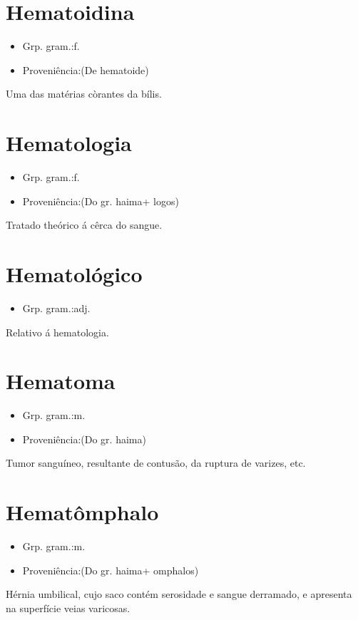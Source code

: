 \documentclass{article}
\begin{document}
\section{Hematoidina}
\begin{itemize}
\item {Grp. gram.:f.}
\end{itemize}
\begin{itemize}
\item {Proveniência:(De \textunderscore hematoide\textunderscore )}
\end{itemize}
Uma das matérias còrantes da bílis.
\section{Hematologia}
\begin{itemize}
\item {Grp. gram.:f.}
\end{itemize}
\begin{itemize}
\item {Proveniência:(Do gr. \textunderscore haima\textunderscore  + \textunderscore logos\textunderscore )}
\end{itemize}
Tratado theórico á cêrca do sangue.
\section{Hematológico}
\begin{itemize}
\item {Grp. gram.:adj.}
\end{itemize}
Relativo á hematologia.
\section{Hematoma}
\begin{itemize}
\item {Grp. gram.:m.}
\end{itemize}
\begin{itemize}
\item {Proveniência:(Do gr. \textunderscore haima\textunderscore )}
\end{itemize}
Tumor sanguíneo, resultante de contusão, da ruptura de varizes, etc.
\section{Hematômphalo}
\begin{itemize}
\item {Grp. gram.:m.}
\end{itemize}
\begin{itemize}
\item {Proveniência:(Do gr. \textunderscore haima\textunderscore  + \textunderscore omphalos\textunderscore )}
\end{itemize}
Hérnia umbilical, cujo saco contém serosidade e sangue derramado, e apresenta na superfície veias varicosas.
\end{document}
